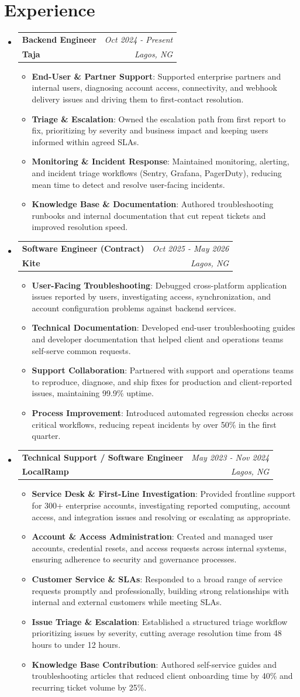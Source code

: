 \documentclass[a4paper, 20pt]{article}
\makeatletter
\newcommand{\resumeItem}[2]{ \item\small{ \textbf{#1}{: #2} } }
\newcommand{\resumeJobHeading}[4]{ %
\vspace{4pt}
\item[]
\begin{tabular*}{0.97\textwidth}{l@{\extracolsep{\fill}}r}
	\textbf{#1} & \textit{#3} \\
	\textbf{#4} & \textit{#2} \\
\end{tabular*}
\vspace{0pt}
}
\newcommand{\resumeSubHeadingListStart}{\begin{itemize}[leftmargin=*,topsep=4pt]}
\newcommand{\resumeSubHeadingListEnd}{\end{itemize}}
\newcommand{\resumeItemListStart}{\begin{itemize}[topsep=0pt,itemsep=0pt,parsep=0pt]}
\newcommand{\resumeItemListEnd}{\end{itemize}}
\makeatother
\begin{document}
	\vspace{-5pt}
	\section{Experience}
	\resumeSubHeadingListStart
	\resumeJobHeading{Backend Engineer}{Lagos, NG}{Oct 2024 - Present}{Taja}
	\resumeItemListStart
	\resumeItem{End-User \& Partner Support}
	{Supported enterprise partners and internal users, diagnosing account access, connectivity, and webhook delivery issues and driving them to first-contact resolution.}
	\resumeItem{Triage \& Escalation}
	{Owned the escalation path from first report to fix, prioritizing by severity and business impact and keeping users informed within agreed SLAs.}
	\resumeItem{Monitoring \& Incident Response}
	{Maintained monitoring, alerting, and incident triage workflows (Sentry, Grafana, PagerDuty), reducing mean time to detect and resolve user-facing incidents.}
	\resumeItem{Knowledge Base \& Documentation}
{Authored troubleshooting runbooks and internal documentation that cut repeat tickets and improved resolution speed.}
	\resumeItemListEnd

	\resumeJobHeading{Software Engineer (Contract)}{Lagos, NG}{Oct 2025 - May 2026}{Kite}
	\resumeItemListStart
	\resumeItem{User-Facing Troubleshooting}
	{Debugged cross-platform application issues reported by users, investigating access, synchronization, and account configuration problems against backend services.}
	\resumeItem{Technical Documentation}
	{Developed end-user troubleshooting guides and developer documentation that helped client and operations teams self-serve common requests.}
	\resumeItem{Support Collaboration}
	{Partnered with support and operations teams to reproduce, diagnose, and ship fixes for production and client-reported issues, maintaining 99.9\% uptime.}
	\resumeItem{Process Improvement}
	{Introduced automated regression checks across critical workflows, reducing repeat incidents by over 50\% in the first quarter.}
	\resumeItemListEnd

	\resumeJobHeading{Technical Support / Software Engineer}{Lagos, NG}{May 2023 - Nov 2024}{LocalRamp}
	\resumeItemListStart
	\resumeItem{Service Desk \& First-Line Investigation}
	{Provided frontline support for 300+ enterprise accounts, investigating reported computing, account access, and integration issues and resolving or escalating as appropriate.}
	\resumeItem{Account \& Access Administration}
{Created and managed user accounts, credential resets, and access requests across internal systems, ensuring adherence to security and governance processes.}
	\resumeItem{Customer Service \& SLAs}
	{Responded to a broad range of service requests promptly and professionally, building strong relationships with internal and external customers while meeting SLAs.}
	\resumeItem{Issue Triage \& Escalation}
	{Established a structured triage workflow prioritizing issues by severity, cutting average resolution time from 48 hours to under 12 hours.}
	\resumeItem{Knowledge Base Contribution}
	{Authored self-service guides and troubleshooting articles that reduced client onboarding time by 40\% and recurring ticket volume by 25\%.}
	\resumeItemListEnd
	\resumeSubHeadingListEnd
\end{document}
